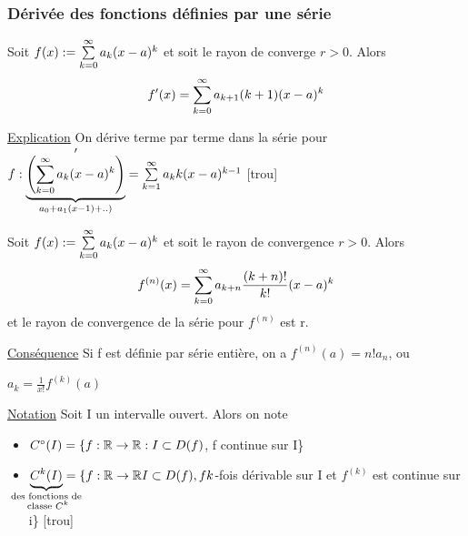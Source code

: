 \documentclass[12pt,a4paper]{article}
\begin{document}
{\subsubsection{Dérivée des fonctions définies par une série}
\begin{boite}
	\Theoreme Soit $f(x):= \sum\limits_{k=0}^{\infty}{a_k(x-a)^k}$ et soit le rayon de converge $r > 0$. Alors
	\begin{equation}
		f'(x) = \sum\limits_{k=0}^{\infty}{a_{k+1}(k+1)(x-a)^k}
	\end{equation}
\end{boite}
\underline{Explication} On dérive terme par terme dans la série pour \\
$f: \underbrace{\left(\sum\limits_{k=0}^{\infty}{a_k(x-a)^k}\right)}_{a_0+a_1(x-1)+..)}' = \sum\limits_{k=1}^{\infty}{a_kk(x-a)^{k-1}}$
[trou]
\begin{boite}
	\Theoreme Soit $f(x):= \sum\limits_{k=0}^{\infty}{a_k(x-a)^k}$ et soit le rayon de convergence $r > 0$. Alors 
	\begin{equation}
		f^{(n)}(x) = \sum\limits_{k=0}^{\infty}{a_{k+n}\frac{(k+n)!}{k!}(x-a)^k}
	\end{equation}
	et le rayon de convergence de la série pour $f^{(n)}$ est r.
\end{boite}
\begin{boite}
\underline{Conséquence} Si f est définie par série entière, on a $f^{(n)}(a) = n!a_n$, ou 
\begin{boite}[0.25]
	$a_k = \frac{1}{x!}f^{(k)}(a)$
\end{boite}
\end{boite}
\underline{Notation} Soit I un intervalle ouvert. Alors on note 
\begin{itemize}
	\item $C^{\circ}(I) = \{f:\mathbb{R} \to \mathbb{R} : I \subset D(f)$, f continue sur I\}
	\item $\underbrace{C^k(I)}_{\mathclap{\substack{\text{des fonctions de} \\ \text{ classe } C^k}}} = \{f:\rtor I\subset D(f), f k$-fois dérivable sur I et $f^{(k)}$ est continue sur i\}
	[trou]
\end{itemize}
}
\end{document}
